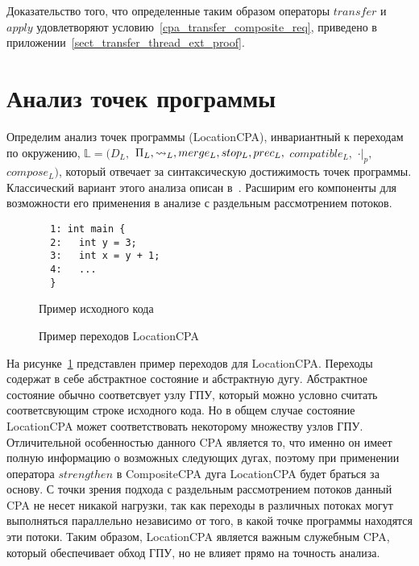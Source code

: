 Доказательство того, что определенные таким образом операторы $transfer$ и $apply$ удовлетворяют условию~\ref{cpa_transfer_composite_req}, приведено в приложении~\ref{sect_transfer_thread_ext_proof}. 


\section{Анализ точек программы}
\label{sect_location_analysis}

Определим анализ точек программы (LocationCPA), инвариантный к переходам по окружению,
$\mathbb{L}=(D_{L},$ $\Pi_{L}, \leadsto_{L}, merge_{L}, stop_{L}, prec_{L},$ $compatible_{L},$ $\cdot|_p,$ $compose_L)$, который отвечает за синтаксическую достижимость точек программы.
Классический вариант этого анализа описан в~\cite{Beyer08}.
Расширим его компоненты для возможности его применения в анализе с раздельным рассмотрением потоков.

\begin{figure}[h]
\begin{minipage}[h]{0.3\textwidth}
\begin{verbatim}
  1: int main {
  2:   int y = 3;
  3:   int x = y + 1;
  4:   ...
  }
\end{verbatim}
\caption{Пример исходного кода}
\label{LocationCodeExample}
\end{minipage}
\hfill
\begin{minipage}{0.6\textwidth}
    \caption{Пример переходов LocationCPA}
    \label{img:LocationCPA}
\end{minipage}
\end{figure}

На рисунке~\ref{img:LocationCPA} представлен пример переходов для LocationCPA. 
Переходы содержат в себе абстрактное состояние и абстрактную дугу.
Абстрактное состояние обычно соответсвует узлу ГПУ, который можно условно считать соответсвующим строке исходного кода.
Но в общем случае состояние LocationCPA может соответствовать некоторому множеству узлов ГПУ.
Отличительной особенностью данного CPA является то, что именно он имеет полную информацию о возможных следующих дугах, поэтому при применении оператора $strengthen$ в CompositeCPA дуга LocationCPA будет браться за основу.
С точки зрения подхода с раздельным рассмотрением потоков данный CPA не несет никакой нагрузки, так как переходы в различных потоках могут выполняться параллельно независимо от того, в какой точке программы находятся эти потоки.
Таким образом, LocationCPA является важным служебным CPA, который обеспечивает обход ГПУ, но не влияет прямо на точность анализа.

